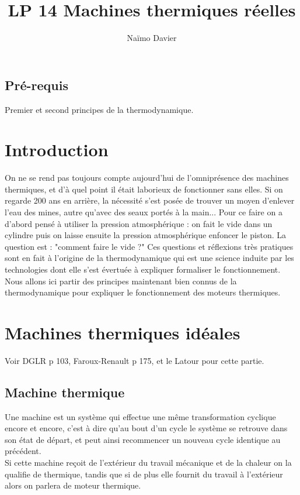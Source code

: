 \documentclass[12pt,prb,aps,epsf]{report}
\begin{document}
	
	\title{LP 14 Machines thermiques réelles}
	\author{Naïmo Davier}
	
	\maketitle
	
	\tableofcontents
	
	\pagebreak
	
	
\subsection{Pré-requis}
Premier et second principes de la thermodynamique.

\section{Introduction}

On ne se rend pas toujours compte aujourd'hui de l'omniprésence des machines thermiques, et d'à quel point il était laborieux de fonctionner sans elles. Si on regarde 200 ans en arrière, la nécessité s'est posée de trouver un moyen d'enlever l'eau des mines, autre qu'avec des seaux portés à la main... Pour ce faire on a d'abord pensé à utiliser la pression atmosphérique : on fait le vide dans un cylindre puis on laisse ensuite la pression atmosphérique enfoncer le piston. La question est : "comment faire le vide ?" Ces questions et réflexions très pratiques sont en fait à l'origine de la thermodynamique qui est une science induite par les technologies dont elle s'est évertuée à expliquer formaliser le fonctionnement.\\
Nous allons ici partir des principes maintenant bien connus de la thermodynamique pour expliquer le fonctionnement des moteurs thermiques.

\section{Machines thermiques idéales}
Voir DGLR p 103, Faroux-Renault p 175, et le Latour pour cette partie.
\subsection{Machine thermique}

Une machine est un système qui effectue une même transformation cyclique encore et encore, c'est à dire qu'au bout d'un cycle le système se retrouve dans son état de départ, et peut ainsi recommencer un nouveau cycle identique au précédent.\\
Si cette machine reçoit de l'extérieur du travail mécanique et de la chaleur on la qualifie de thermique, tandis que si de plus elle fournit du travail à l'extérieur alors on parlera de moteur thermique.\\
\end{document}
